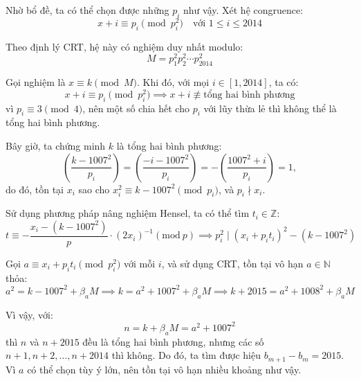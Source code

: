 \documentclass[../09-contruction-methods.tex]{subfiles}
\begin{document}
\begin{soln}
	Nhờ bổ đề, ta có thể chọn được những \( p_i \) như vậy.
	Xét hệ congruence:
	\[
		x + i \equiv p_i \pmod{p_i^2} \quad \text{với } 1 \le i \le 2014 \tag{*}
	\]
	
	Theo định lý CRT, hệ này có nghiệm duy nhất modulo:
	\[
		M = p_1^2 p_2^2 \cdots p_{2014}^2
	\]
	
	Gọi nghiệm là \( x \equiv k \pmod{M} \). Khi đó, với mọi \( i \in [1, 2014] \), ta có:
	\[
		x + i \equiv p_i \pmod{p_i^2} \implies x + i \not\equiv \text{tổng hai bình phương}
	\]
	vì \( p_i \equiv 3 \pmod{4} \), nên một số chia hết cho \( p_i \) với lũy thừa lẻ thì không thể là tổng hai bình phương.
	
	Bây giờ, ta chứng minh \( k \) là tổng hai bình phương:
	\[
		\left( \frac{k - 1007^2}{p_i} \right) = \left( \frac{-i - 1007^2}{p_i} \right) = - \left( \frac{1007^2 + i}{p_i} \right) = 1,
	\]
	do đó, tồn tại \( x_i \) sao cho \( x_i^2 \equiv k - 1007^2 \pmod{p_i} \), và \( p_i \nmid x_i \).

	Sử dụng phương pháp nâng nghiệm Hensel, ta có thể tìm \( t_i \in \mathbb{Z} \):
	\[
		t\equiv -\dfrac{x_i-(k-1007^2)}{p}\cdot (2x_i)^{-1} (\mathrm{mod}\ p) \implies p_i^2 \mid (x_i + p_i t_i)^2 - (k - 1007^2)
	\]
	
	Gọi \( a \equiv x_i + p_i t_i \pmod{p_i^2} \) với mỗi \( i \), và sử dụng CRT, tồn tại vô hạn \( a \in \mathbb{N} \) thỏa:
	\[
		a^2 = k - 1007^2 + \beta_a M \implies k = a^2 + 1007^2 + \beta_a M \implies k + 2015 = a^2 + 1008^2 + \beta_a M
	\]
	
	Vì vậy, với:
	\[
		n = k + \beta_a M = a^2 + 1007^2
	\]
	thì \( n \) và \( n + 2015 \) đều là tổng hai bình phương, nhưng các số \( n+1, n+2, \dots, n+2014 \) thì không.
	Do đó, ta tìm được hiệu \( b_{m+1} - b_m = 2015 \). Vì \( a \) có thể chọn tùy ý lớn, nên tồn tại vô hạn nhiều khoảng như vậy.
\end{soln}

\end{document}
